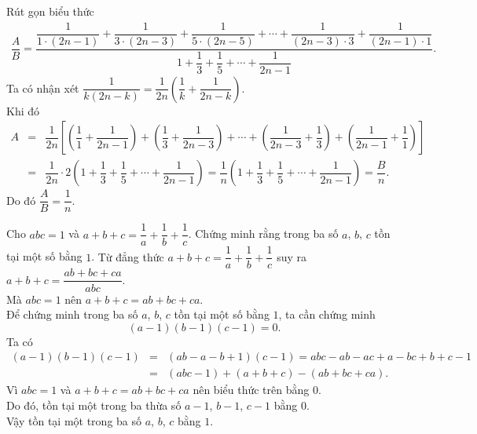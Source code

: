 \begin{bt}%
 Rút gọn biểu thức
 \begin{eqnarray*}
  \dfrac{A}{B} = \dfrac{\dfrac{1}{1 \cdot (2n-1)} + \dfrac{1}{3 \cdot (2n-3)} + \dfrac{1}{5 \cdot (2n-5)} + \cdots + \dfrac{1}{(2n-3) \cdot 3} + \dfrac{1}{(2n-1) \cdot 1}}{1 + \dfrac{1}{3} + \dfrac{1}{5} + \cdots + \dfrac{1}{2n-1}}.
 \end{eqnarray*}
 \loigiai
  {
  Ta có nhận xét $\dfrac{1}{k(2n-k)} = \dfrac{1}{2n}\left(\dfrac{1}{k} + \dfrac{1}{2n-k}\right)$.\\
  Khi đó
  \allowdisplaybreaks
  \begin{eqnarray*}
   A &=& \dfrac{1}{2n}\left[\left(\dfrac{1}{1}+\dfrac{1}{2n-1}\right) + \left(\dfrac{1}{3}+\dfrac{1}{2n-3}\right) + \cdots + \left(\dfrac{1}{2n-3}+\dfrac{1}{3}\right) + \left(\dfrac{1}{2n-1}+\dfrac{1}{1}\right)  \right]\\
   &=& \dfrac{1}{2n} \cdot 2 \left(1 + \dfrac{1}{3} + \dfrac{1}{5} + \cdots + \dfrac{1}{2n-1}\right)
   = \dfrac{1}{n} \left(1+\dfrac{1}{3}+\dfrac{1}{5}+\cdots + \dfrac{1}{2n-1}\right) = \dfrac{B}{n}.
  \end{eqnarray*}
  Do đó $\dfrac{A}{B} = \dfrac{1}{n}$.
  }
\end{bt}

\begin{bt}%
 Cho $abc=1$ và $a+b+c=\dfrac{1}{a}+\dfrac{1}{b}+\dfrac{1}{c}$. Chứng minh rằng trong ba số $a$, $b$, $c$ tồn tại một số bằng $1$.
 \loigiai
  {
  Từ đẳng thức $a+b+c=\dfrac{1}{a}+\dfrac{1}{b}+\dfrac{1}{c}$ suy ra $a+b+c=\dfrac{ab+bc+ca}{abc}$.\\
  Mà $abc=1$ nên $a+b+c=ab+bc+ca$.\\
  Để chứng minh trong ba số $a$, $b$, $c$ tồn tại một số bằng $1$, ta cần chứng minh
  \[(a-1)(b-1)(c-1)=0.\]
  Ta có
  \allowdisplaybreaks
  \begin{eqnarray*}
   (a-1)(b-1)(c-1) &=& (ab-a-b+1)(c-1) = abc-ab-ac+a-bc+b+c-1\\
   &=& (abc-1)+(a+b+c)-(ab+bc+ca).
  \end{eqnarray*}
  Vì $abc=1$ và $a+b+c=ab+bc+ca$ nên biểu thức trên bằng $0$.\\
  Do đó, tồn tại một trong ba thừa số $a-1$, $b-1$, $c-1$ bằng $0$.\\
  Vậy tồn tại một trong ba số $a$, $b$, $c$ bằng $1$.
  }
\end{bt}

